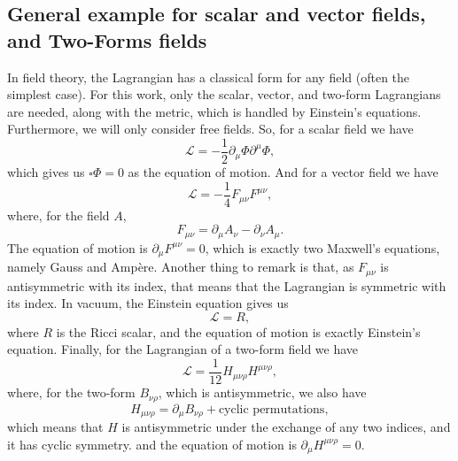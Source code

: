 \documentclass{article}
\begin{document}
\subsection{General example for scalar and vector fields, and Two-Forms fields}
In field theory, the Lagrangian has a classical form for any field (often the simplest case).
For this work, only the scalar, vector, and two-form Lagrangians are needed, along with the metric, which is handled by Einstein's equations. Furthermore, we will only consider free fields.
So, for a scalar field we have
\begin{equation} \label{scalafield}
    \boxed{\mathcal{L} = - \frac{1}{2} \partial_\mu \Phi \partial^ \mu \Phi,}
\end{equation}
which gives us $\square \Phi =0$ as the equation of motion.
And for a vector field we have
\begin{equation}\label{vectorialfield}
    \boxed{\mathcal{L} = - \frac{1}{4}F_{\mu \nu}F^{\mu \nu},}
\end{equation}
where, for the field $A$,
\begin{equation*}
    F_{\mu \nu} = \partial_\mu A_\nu - \partial_\nu A_\mu.
\end{equation*}
The equation of motion is $\partial_\mu F^{\mu \nu} = 0$, which is exactly two Maxwell's equations, namely Gauss and Ampère. Another thing to remark is that, as $F_{\mu \nu}$ is antisymmetric with its index, that means that the Lagrangian is symmetric with its index.
In vacuum, the Einstein equation gives us
\begin{equation*} \label{einsteinaction}
    \boxed{\mathcal{L} = R,}
\end{equation*}
where $R$ is the Ricci scalar, and the equation of motion is exactly Einstein's equation.
Finally, for the Lagrangian of a two-form field
we have
\begin{equation} \label{Baction}
    \boxed{\mathcal{L} = \frac{1}{12} H_{ \mu \nu \rho}H^{ \mu\nu \rho},}
\end{equation}
where, for the two-form $B_{\nu \rho}$, which is antisymmetric, we also have
\begin{equation*}
    H_{ \mu \nu \rho} = \partial_ \mu B_{\nu \rho} + \text{cyclic permutations},
\end{equation*}
which means that $H$ is antisymmetric under the exchange of any two indices, and it has cyclic symmetry.
and the equation of motion is $\partial_\mu H^{\mu \nu\rho} = 0$.
\end{document}
